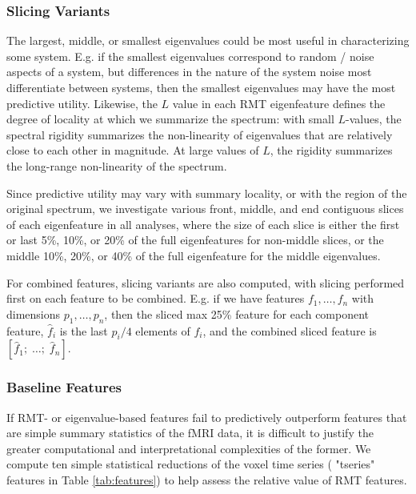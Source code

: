 \documentclass[12pt]{spieman}  %
\begin{document}
\begin{spacing}{2}
\subsubsection{Slicing Variants}

The largest, middle, or smallest eigenvalues could be most useful in
characterizing some system. E.g. if the smallest eigenvalues correspond to
random / noise aspects of a system, but differences in the nature of the system
noise most differentiate between systems, then the smallest eigenvalues may
have the most predictive utility.  Likewise, the \(L\) value in each RMT
eigenfeature defines the degree of locality at which we summarize the spectrum:
with small \(L\)-values, the spectral rigidity summarizes the non-linearity of
eigenvalues that are relatively close to each other in magnitude. At large
values of \(L\), the rigidity summarizes the long-range non-linearity of the
spectrum.

Since predictive utility may vary with summary locality, or with the region of
the original spectrum, we investigate various front, middle, and end contiguous
slices of each eigenfeature in all analyses, where the size of each slice is
either the first or last 5\%, 10\%, or 20\% of the full eigenfeatures for
non-middle slices, or the middle 10\%, 20\%, or 40\% of the full eigenfeature for
the middle eigenvalues.

For combined features, slicing variants are also computed, with slicing
performed first on each feature to be combined. E.g. if we have features \(f_1,
\dots,  f_n\) with dimensions \(p_1, \dots, p_n\), then the sliced max 25\%
feature for each component feature, \(\hat{f}_i\) is the last \(p_i / 4\)
elements of \(f_i\), and the combined sliced feature is  \([\hat{f}_1;\;
\dots;\; \hat{f}_n]\).



\subsubsection{Baseline Features}
\label{sec:baselines}

If RMT- or eigenvalue-based features fail to predictively outperform features
that are simple summary statistics of the fMRI data, it is difficult to justify
the greater computational and interpretational complexities of the former. We
compute ten simple statistical reductions of the voxel time series ( "tseries"
features in Table \ref{tab:features}) to help assess the relative value of RMT
features.


\end{spacing}
\end{document}
